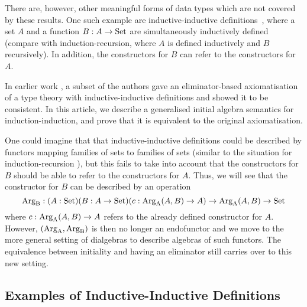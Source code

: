\documentclass[orivec,envcountsame, ,envcountsect]{llncs}
\begin{document}
There are, however, other meaningful forms of data types which are not
covered by these results. One such example are inductive-inductive
definitions~\cite{nordvallforsbergSetzer2010indind}, where a set $A$
and a function $B : A \to \text{Set}$ are simultaneously inductively defined
(compare with induction-recursion, where $A$ is defined inductively
and $B$ recursively).
In addition, the constructors for $B$ can refer to the
constructors for $A$.

In earlier work \cite{nordvallforsbergSetzer2010indind}, a subset of
the authors gave an eliminator-based axiomatisation of a type theory
with inductive-inductive definitions and showed it to be
consistent. In this article, we describe a generalised initial algebra
semantics for induction-induction, and prove that it is equivalent to
the original axiomatisation.

One could imagine that that inductive-inductive definitions could be
described by functors mapping families of sets to families of sets
(similar to the situation for induction-recursion
\cite{dybjersetzer2003inalg}), but this fails to take into account
that the constructors for $B$ should be able to refer to the
constructors for $A$. Thus, we will see that the constructor for $B$
can be described by an operation
\[
\text{Arg}_{\text{B}} : (A : \text{Set})(B : A \to \text{Set})(c : \text{Arg}_{\text{A}}(A, B) \to A) \to \text{Arg}_{\text{A}}(A, B) \to \text{Set}
\]
where $c : \text{Arg}_{\text{A}}(A, B) \to A$ refers to the already defined
constructor for $A$. However, $(\text{Arg}_{\text{A}}, \text{Arg}_{\text{B}})$ is then no longer an
endofunctor and we move to the more general setting of dialgebras
\cite{hagino1987phdthesis,pollZwanenburg2001dialgebra} to describe
algebras of such functors.
%
The equivalence between initiality and having an eliminator still
carries over to this new setting.


\subsection{Examples of Inductive-Inductive Definitions}
\label{sec:ex-indind}
\end{document}
